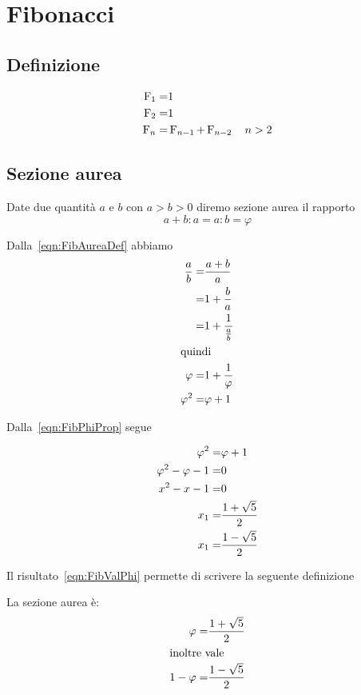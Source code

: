 \chapter{Fibonacci}
\section{Definizione}
\begin{defn}
	\begin{align}
		\operatorname{F}_{1}=&1\notag\\
		\operatorname{F}_{2}=&1\notag\\
		\operatorname{F}_{n}=&\operatorname{F}_{n-1}+\operatorname{F}_{n-2}\quad n>2\label{eqn:Fibodef}
	\end{align}
\end{defn}
\section{Sezione aurea}
\begin{defn}
	Date due quantità $a$ e $b$ con $a>b>0$ diremo sezione aurea il rapporto
	\begin{equation}
	a+b:a=a:b=\varphi	
	\end{equation}\label{eqn:FibAureaDef}
\end{defn}
\begin{prop}
	Dalla~\vref{eqn:FibAureaDef} abbiamo
	\begin{align}
		\dfrac{a}{b}=&\dfrac{a+b}{a}\notag\\
		=&1+\dfrac{b}{a}\notag\\
		=&1+\dfrac{1}{\frac{a}{b}}\notag\\
		\intertext{quindi}
		\varphi=&1+\dfrac{1}{\varphi}\label{eqn:FibPhiProp}\\
		\varphi^2=&\varphi+1\notag
	\end{align}
\end{prop}
	Dalla~\vref{eqn:FibPhiProp} segue
	\begin{prop}
	\begin{align}
		\varphi^2=&\varphi+1\notag\\
		\varphi^2-\varphi-1=&0\notag\\
		x^2-x-1=&0\label{eqn:FibValPhiEqua}\\
		x_1=&\dfrac{1+\sqrt{5}}{2}\label{eqn:FibValPhi}\\
		x_1=&\dfrac{1-\sqrt{5}}{2}\notag
	\end{align}
\end{prop}
Il risultato~\ref{eqn:FibValPhi} permette di scrivere la seguente definizione
\begin{defn}
La sezione aurea è: 
\begin{align*}
	\varphi=&\dfrac{1+\sqrt{5}}{2}\\
\intertext{inoltre vale}
	1-	\varphi=&\dfrac{1-\sqrt{5}}{2}\\
\end{align*}
\end{defn}
